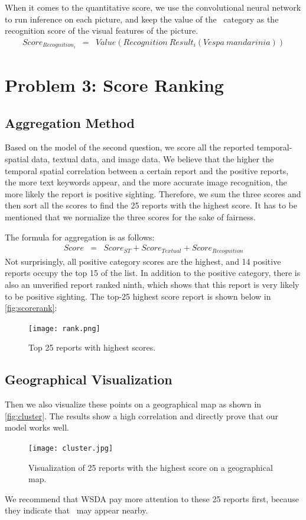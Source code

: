 \documentclass{mcmthesis}
\begin{document}
When it comes to the quantitative score, we use the convolutional neural network to run inference on each picture, and keep the value of the \VM\ category as the recognition score of the visual features of the picture.
\begin{eqnarray}
Score_{Recognition_i} & = & Value(Recognition\ Result_i(Vespa\ mandarinia))
\end{eqnarray}

\section{Problem 3: Score Ranking}
\subsection{Aggregation Method}
Based on the model of the second question, we score all the reported temporal-spatial data, textual data, and image data. We believe that the higher the temporal spatial correlation between a certain report and the positive reports, the more text keywords appear, and the more accurate image recognition, the more likely the report is positive sighting. Therefore, we sum the three scores and then sort all the scores to find the 25 reports with the highest score. It has to be mentioned that we normalize the three scores for the sake of fairness.

The formula for aggregation is as follows:
\begin{eqnarray}
Score & = & Score_{ST}+Score_{Textual}+Score_{Recognition}
\end{eqnarray}
Not surprisingly, all positive category scores are the highest, and 14 positive reports occupy the top 15 of the list. In addition to the positive category, there is also an unverified report ranked ninth, which shows that this report is very likely to be positive sighting. The top-25 highest score report is shown below in \autoref{fig:scorerank}:
\begin{figure}[h]
    \centering
    \texttt{[image: rank.png]}
    \caption{Top 25 reports with highest scores.}
    \label{fig:scorerank}
\end{figure}

\subsection{Geographical Visualization}
Then we also visualize these points on a geographical map as shown in \autoref{fig:cluster}. The results show a high correlation and directly prove that our model works well.
\begin{figure}[h]
    \centering
    \texttt{[image: cluster.jpg]}
    \caption{Visualization of 25 reports with the highest score on a geographical map.}
    \label{fig:cluster}
\end{figure}
We recommend that WSDA pay more attention to these 25 reports first, because they indicate that \VM\ may appear nearby.
\end{document}
